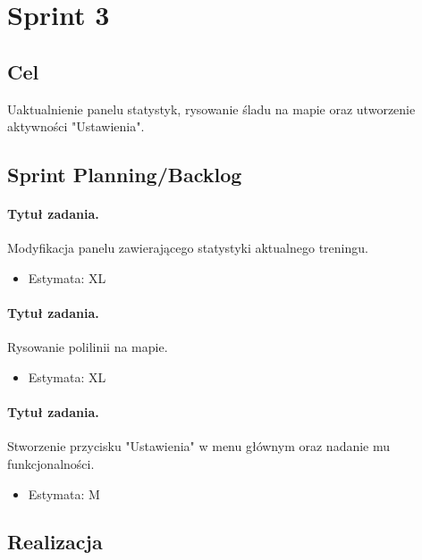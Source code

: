\documentclass[a4paper]{article}
\begin{document}
\section{Sprint 3}

\subsection{Cel} Uaktualnienie panelu statystyk, rysowanie śladu na mapie oraz utworzenie aktywności "Ustawienia".

\subsection{Sprint Planning/Backlog}

\paragraph{Tytuł zadania.} Modyfikacja panelu zawierającego statystyki aktualnego treningu.
\begin{itemize}
\item Estymata: XL
\end{itemize}

\paragraph{Tytuł zadania.} Rysowanie polilinii na mapie.
\begin{itemize}
\item Estymata: XL
\end{itemize}

\paragraph{Tytuł zadania.} Stworzenie przycisku "Ustawienia" w menu głównym oraz nadanie mu funkcjonalności.
\begin{itemize}
\item Estymata: M
\end{itemize}

\subsection{Realizacja}
\end{document}
